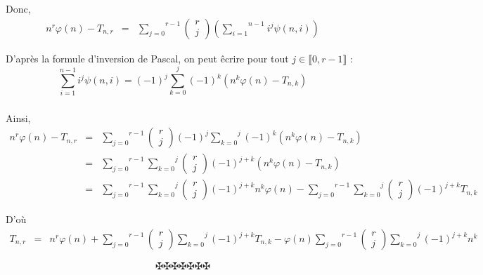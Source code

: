Donc,
\begin{eqnarray*}
  n^r \varphi (n) - T_{n, r} & = & \overset{r - 1}{\underset{j = 0}{\sum}}
  \left( \begin{array}{c}
    r\\
    j
  \end{array} \right) \left( \underset{}{\overset{n - 1}{\underset{i =
  1}{\sum}}} i^j \psi (n, i) \right)
\end{eqnarray*}


D'apr{\`e}s la formule d'inversion de Pascal, on peut {\^e}crire pour tout $j
\in \llbracket 0, r - 1 \rrbracket$ :
\[ \underset{}{\overset{n - 1}{\underset{i = 1}{\sum}}} i^j \psi (n, i) = (-
   1)^j \overset{j}{\underset{k = 0}{\sum}} (- 1)^k (n^k \varphi (n) - T_{n,
   k}) \]


Ainsi,
\begin{eqnarray*}
  n^r \varphi (n) - T_{n, r} & = & \overset{r - 1}{\underset{j = 0}{\sum}}
  \left( \begin{array}{c}
    r\\
    j
  \end{array} \right) (- 1)^j \overset{j}{\underset{k = 0}{\sum}} (- 1)^k (n^k
  \varphi (n) - T_{n, k})\\
  & = & \overset{r - 1}{\underset{j = 0}{\sum}} \overset{j}{\underset{k =
  0}{\sum}} \left( \begin{array}{c}
    r\\
    j
  \end{array} \right) (- 1)^{j + k} (n^k \varphi (n) - T_{n, k})\\
  & = & \overset{r - 1}{\underset{j = 0}{\sum}} \overset{j}{\underset{k =
  0}{\sum}} \left( \begin{array}{c}
    r\\
    j
  \end{array} \right) (- 1)^{j + k} n^k \varphi (n) - \overset{r -
  1}{\underset{j = 0}{\sum}} \overset{j}{\underset{k = 0}{\sum}} \left(
  \begin{array}{c}
    r\\
    j
  \end{array} \right) (- 1)^{j + k} T_{n, k}
\end{eqnarray*}


D'o{\`u}
\begin{eqnarray*}
  T_{n, r} & = & n^r \varphi (n) + \overset{r - 1}{\underset{j = 0}{\sum}}
  \left( \begin{array}{c}
    r\\
    j
  \end{array} \right) \overset{j}{\underset{k = 0}{\sum}} (- 1)^{j + k} T_{n,
  k} - \varphi (n) \overset{r - 1}{\underset{j = 0}{\sum}} \left(
  \begin{array}{c}
    r\\
    j
  \end{array} \right) \overset{j}{\underset{k = 0}{\sum}} (- 1)^{j + k} n^k
\end{eqnarray*}

\[ \maltese \maltese \maltese \maltese \maltese \maltese \maltese \]
